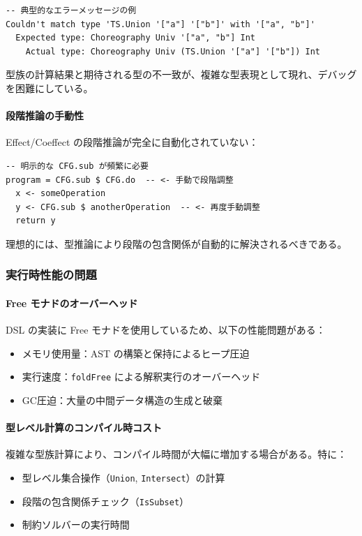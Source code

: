 \begin{verbatim}
-- 典型的なエラーメッセージの例
Couldn't match type 'TS.Union '["a"] '["b"]' with '["a", "b"]'
  Expected type: Choreography Univ '["a", "b"] Int
    Actual type: Choreography Univ (TS.Union '["a"] '["b"]) Int
\end{verbatim}

型族の計算結果と期待される型の不一致が、複雑な型表現として現れ、デバッグを困難にしている。

\paragraph{段階推論の手動性}
Effect/Coeffect の段階推論が完全に自動化されていない：

\begin{verbatim}
-- 明示的な CFG.sub が頻繁に必要
program = CFG.sub $ CFG.do  -- <- 手動で段階調整
  x <- someOperation
  y <- CFG.sub $ anotherOperation  -- <- 再度手動調整
  return y
\end{verbatim}

理想的には、型推論により段階の包含関係が自動的に解決されるべきである。

\subsubsection{実行時性能の問題}

\paragraph{Free モナドのオーバーヘッド}
DSL の実装に Free モナドを使用しているため、以下の性能問題がある：
\begin{itemize}
\item メモリ使用量：AST の構築と保持によるヒープ圧迫
\item 実行速度：\texttt{foldFree} による解釈実行のオーバーヘッド
\item GC圧迫：大量の中間データ構造の生成と破棄
\end{itemize}

\paragraph{型レベル計算のコンパイル時コスト}
複雑な型族計算により、コンパイル時間が大幅に増加する場合がある。特に：
\begin{itemize}
\item 型レベル集合操作（\texttt{Union}, \texttt{Intersect}）の計算
\item 段階の包含関係チェック（\texttt{IsSubset}）
\item 制約ソルバーの実行時間
\end{itemize}

